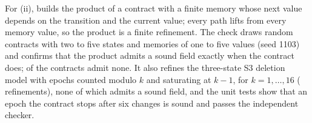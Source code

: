 For (ii),  builds the product of a contract with a finite memory
whose next value depends on the transition and the current value; every path
lifts from every memory value, so the product is a finite refinement. The
check draws \sRefinementChecks{} random contracts with two to five states and
memories of one to five values (seed 1103) and confirms that the product
admits a sound field exactly when the contract does; \sRefinementFailing{} of
the contracts admit none. It also refines the three-state S3 deletion model
with epochs counted modulo $k$ and saturating at $k-1$, for $k=1,\dots,16$
(\sEpochChecks{} refinements), none of which admits a sound field, and the unit
tests show that an epoch the contract stops after six changes is sound and
passes the independent checker.
